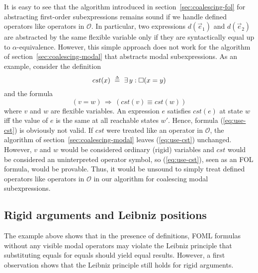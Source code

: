 \documentclass[a4paper,fleqn,envcountsame,orivec]{llncs}
\newcommand{\implies}{\Rightarrow}
\newcommand{\OO}{\mathcal{O}}
\newcommand{\edmargin}[2]{\marginpar{\raggedright\footnotesize\color{red}#1: #2}}
\newcommand{\edmargin}[2]{}
\def\llmargin{\edmargin{LL}}
\def\smmargin{\edmargin{SM}}
\def\ddmargin{\edmargin{DD}}
\begin{document}
It is easy
to see that the algorithm introduced in
section~\ref{sec:coalescing-fol} for abstracting first-order subexpressions
remains sound if we handle defined operators like operators in $\OO$.
In particular, two expressions $d(\vec{e}_1)$ and $d(\vec{e}_2)$
are abstracted by the same flexible variable only if they are syntactically
equal up to $\alpha$-equivalence.
%
However, this simple approach does not work for
the algorithm of section~\ref{sec:coalescing-modal} that abstracts
modal subexpressions. As an example, consider the
definition
%
\begin{equation}\label{eq:def-cst}
  cst(x)\ \deq\ \E y: \Box(x=y)
\end{equation}
%
and the formula
\begin{equation}\label{eq:use-cst}
  (v=w) \,\implies\, (cst(v) \equiv cst(w))
\end{equation}
where $v$ and $w$ are flexible variables.  An expression $e$ satisfies
$cst(e)$ at state $w$ iff the value of $e$ is the same at all
reachable states $w'$.  Hence, formula (\ref{eq:use-cst}) is obviously
not valid.  If $cst$ were treated like an operator in $\OO$, the
algorithm of section~\ref{sec:coalescing-modal} leaves
(\ref{eq:use-cst}) unchanged.  However, $v$ and $w$ would be
considered ordinary (rigid) variables and $cst$ would be considered an
uninterpreted operator symbol, so (\ref{eq:use-cst}), seen as an FOL
 formula, would be
provable.  Thus, it would be unsound to simply treat defined operators
like operators in $\OO$ in our algorithm for coalescing modal
subexpressions.


\subsection{Rigid arguments and Leibniz positions}
\label{sec:leibniz-cases}

The example above shows that in the presence of definitions, FOML formulas
without any
visible modal operators may violate the Leibniz principle that
substituting equals for equals should yield equal results. However, a first
observation shows that the Leibniz principle still holds for rigid arguments.
\end{document}
